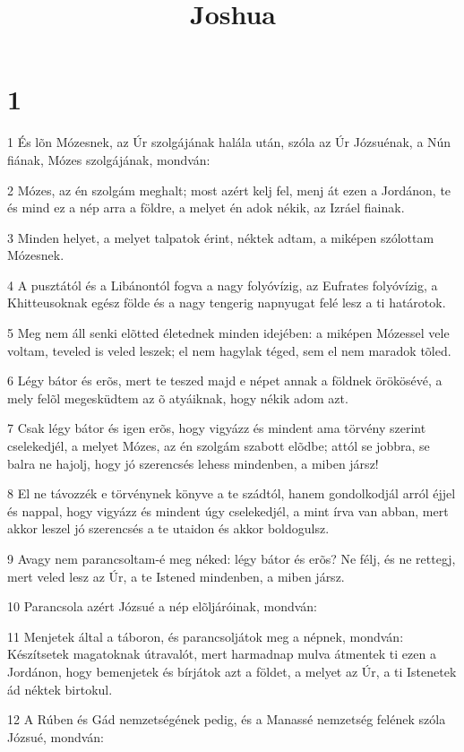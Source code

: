 

\title{Joshua}


\chapter{1}

\par 1 És lõn Mózesnek, az Úr szolgájának halála után, szóla az Úr Józsuénak,  a Nún fiának, Mózes szolgájának, mondván:
\par 2 Mózes, az én szolgám meghalt; most azért kelj fel, menj át ezen a Jordánon, te és mind ez a nép arra a földre, a melyet én adok nékik, az Izráel fiainak.
\par 3 Minden helyet, a melyet talpatok érint, néktek adtam, a miképen szólottam Mózesnek.
\par 4 A pusztától és a Libánontól fogva a nagy folyóvízig, az Eufrates folyóvízig, a Khitteusoknak egész földe és a nagy tengerig napnyugat felé lesz a ti határotok.
\par 5 Meg nem áll senki elõtted életednek minden idejében: a miképen Mózessel vele voltam, teveled is veled leszek; el nem hagylak téged, sem el nem maradok  tõled.
\par 6 Légy bátor és erõs, mert te teszed majd e népet annak a földnek örökösévé,  a mely felõl megesküdtem az õ atyáiknak, hogy nékik adom azt.
\par 7 Csak légy bátor és igen erõs, hogy vigyázz és mindent ama törvény szerint cselekedjél, a melyet Mózes, az én szolgám szabott elõdbe; attól se jobbra, se balra ne hajolj, hogy jó szerencsés lehess mindenben, a miben jársz!
\par 8 El ne távozzék e törvénynek könyve a te szádtól, hanem gondolkodjál arról éjjel és nappal, hogy vigyázz és mindent úgy cselekedjél, a mint írva van abban, mert akkor leszel jó szerencsés a te utaidon és akkor boldogulsz.
\par 9 Avagy nem parancsoltam-é meg néked: légy bátor és erõs? Ne félj, és ne rettegj,  mert veled lesz az Úr, a te Istened mindenben, a miben jársz.
\par 10 Parancsola azért Józsué a nép elõljáróinak, mondván:
\par 11 Menjetek által a táboron, és parancsoljátok meg a népnek, mondván: Készítsetek magatoknak útravalót, mert harmadnap mulva átmentek ti ezen a Jordánon, hogy bemenjetek és bírjátok azt a földet, a melyet az Úr, a ti Istenetek ád néktek birtokul.
\par 12 A Rúben és Gád nemzetségének pedig, és a Manassé nemzetség felének szóla Józsué, mondván:
